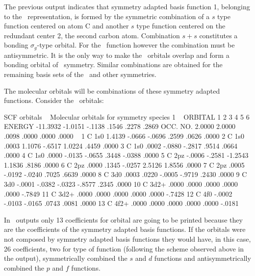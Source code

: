 The previous output indicates that symmetry adapted basis function 1,
belonging to the \aog\ representation, is formed by
the symmetric combination of a $s$ type function centered on atom C and 
another $s$ type function centered on the redundant center 2, the second
carbon atom. Combination $s+s$ constitutes a bonding $\sigma_g$-type
orbital. For the \pz\ function however the combination must be 
antisymmetric. It is the only way to make the \pz\ orbitals overlap
and form a bonding orbital of \aog\ symmetry. Similar combinations are obtained for the
remaining basis sets of the \aog\ and other symmetries.

The molecular orbitals will be combinations of these symmetry adapted
functions. Consider the \aog\ orbitals:

\begin{sourcelisting}
   SCF orbitals
~
   Molecular orbitals for symmetry species 1
~
   ORBITAL        1         2         3         4         5         6   
   ENERGY    -11.3932   -1.0151    -.1138     .1546     .2278     .2869 
   OCC. NO.    2.0000    2.0000     .0098     .0000     .0000     .0000 
~
 1 C   1s0     1.4139    -.0666    -.0696     .2599     .0626     .0000 
 2 C   1s0      .0003    1.1076    -.6517    1.0224     .4459     .0000 
 3 C   1s0      .0002    -.0880    -.2817     .9514     .0664     .0000 
 4 C   1s0      .0000    -.0135    -.0655     .3448    -.0388     .0000 
 5 C   2pz     -.0006    -.2581   -1.2543    1.1836     .8186     .0000 
 6 C   2pz      .0000     .1345    -.0257    2.5126    1.8556     .0000 
 7 C   2pz      .0005    -.0192    -.0240     .7025     .6639     .0000 
 8 C   3d0      .0003     .0220    -.0005    -.9719     .2430     .0000 
 9 C   3d0     -.0001    -.0382    -.0323    -.8577     .2345     .0000 
10 C   3d2+     .0000     .0000     .0000     .0000     .0000    -.7849 
11 C   3d2+     .0000     .0000     .0000     .0000     .0000    -.7428 
12 C   4f0     -.0002    -.0103    -.0165     .0743     .0081     .0000 
13 C   4f2+     .0000     .0000     .0000     .0000     .0000    -.0181 
\end{sourcelisting}

In \molcas\ outputs only 13 coefficients for orbital are going to be printed 
because they are the coefficients of the symmetry adapted basis
functions. If the orbitals were not composed by symmetry adapted basis
functions they would have, in this case, 26 coefficients, two for type of 
function (following the scheme observed above in the  output),
symmetrically combined the $s$ and $d$ functions and antisymmetrically
combined the $p$ and $f$ functions.

